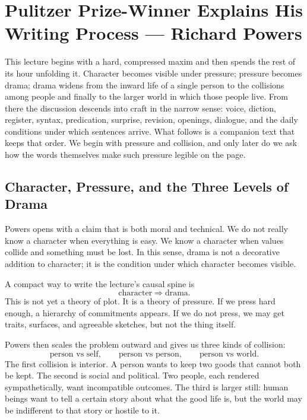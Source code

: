 \chapter{Pulitzer Prize-Winner Explains His Writing Process --- Richard Powers}

This lecture begins with a hard, compressed maxim and then spends the rest of its hour unfolding it. Character becomes visible under pressure; pressure becomes drama; drama widens from the inward life of a single person to the collisions among people and finally to the larger world in which those people live. From there the discussion descends into craft in the narrow sense: voice, diction, register, syntax, predication, surprise, revision, openings, dialogue, and the daily conditions under which sentences arrive. What follows is a companion text that keeps that order. We begin with pressure and collision, and only later do we ask how the words themselves make such pressure legible on the page.

\section{Character, Pressure, and the Three Levels of Drama}

Powers opens with a claim that is both moral and technical. We do not really know a character when everything is easy. We know a character when values collide and something must be lost. In this sense, drama is not a decorative addition to character; it is the condition under which character becomes visible.

A compact way to write the lecture's causal spine is
\begin{equation}
\text{character} \Rightarrow \text{drama}.
\end{equation}
This is not yet a theory of plot. It is a theory of pressure. If we press hard enough, a hierarchy of commitments appears. If we do not press, we may get traits, surfaces, and agreeable sketches, but not the thing itself.

Powers then scales the problem outward and gives us three kinds of collision:
\begin{equation}
\text{person vs self},\qquad \text{person vs person},\qquad \text{person vs world}.
\end{equation}
The first collision is interior. A person wants to keep two goods that cannot both be kept. The second is social and political. Two people, each rendered sympathetically, want incompatible outcomes. The third is larger still: human beings want to tell a certain story about what the good life is, but the world may be indifferent to that story or hostile to it.

